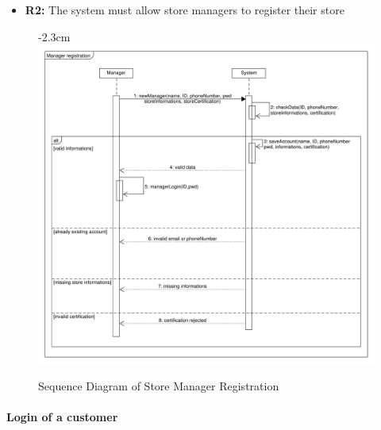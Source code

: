 \documentclass{article}
\begin{document}
\begin{center}
\begin{adjustwidth}{-2.8cm}{}
\begin{tabular}[h!]{|m{7.5em}|m{36em}|}
					\end{tabular}
					\end{adjustwidth}
					
					\begin{itemize}
					\bigskip
					\bigskip
					\bigskip
					 {\bfseries Required functional requirements: }
					\item {\bfseries R2: } The system must allow store managers to register their store

					\end{itemize}
				
					
						
							\begin{figure}
								\begin{adjustwidth} {-2.3cm}{}
									\centering
									\includegraphics[scale=0.5]{SD/2_storeManagerRegistration.pdf}\\
									\caption{Sequence Diagram of Store Manager Registration}
								\end{adjustwidth}
							\end{figure}

						
						
					

				\end{center}

			\newpage


			\paragraph{Login of a customer}
			
\end{document}
